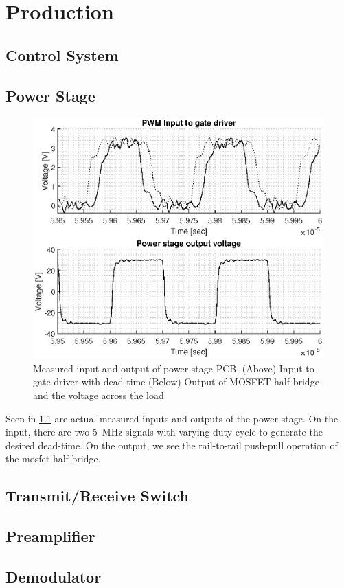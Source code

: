 \chapter{Production}
\section{Control System}

\section{Power Stage}
\begin{figure}[htbp]
	\centering
	\includegraphics[width=.8\textwidth]{Figures/4_transmitter_pcb_out.eps}
	\caption[Measured input and output of power stage PCB]{Measured input and output of power stage PCB. (Above) Input to gate driver with dead-time (Below) Output of MOSFET half-bridge and the voltage across the load}
	\label{fig:4_transmitter_meas}
\end{figure}
Seen in \cref{fig:4_transmitter_meas} are actual measured inputs and outputs of the power stage. On the input, there are two \qty{5}{\mega\hertz} signals with varying duty cycle to generate the desired dead-time. On the output, we see the rail-to-rail push-pull operation of the \gls{mosfet} half-bridge.
\section{Transmit/Receive Switch}
\section{Preamplifier}

\section{Demodulator}


